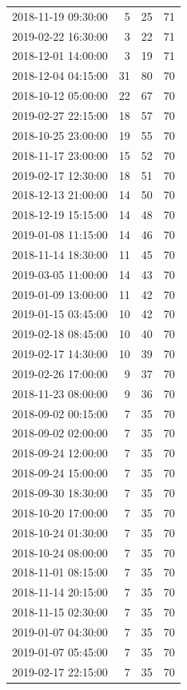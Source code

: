 \begin{tabular}{lrrr}
2018-11-19 09:30:00 & 5 & 25 & 71 \\
2019-02-22 16:30:00 & 3 & 22 & 71 \\
2018-12-01 14:00:00 & 3 & 19 & 71 \\
2018-12-04 04:15:00 & 31 & 80 & 70 \\
2018-10-12 05:00:00 & 22 & 67 & 70 \\
2019-02-27 22:15:00 & 18 & 57 & 70 \\
2018-10-25 23:00:00 & 19 & 55 & 70 \\
2018-11-17 23:00:00 & 15 & 52 & 70 \\
2019-02-17 12:30:00 & 18 & 51 & 70 \\
2018-12-13 21:00:00 & 14 & 50 & 70 \\
2018-12-19 15:15:00 & 14 & 48 & 70 \\
2019-01-08 11:15:00 & 14 & 46 & 70 \\
2018-11-14 18:30:00 & 11 & 45 & 70 \\
2019-03-05 11:00:00 & 14 & 43 & 70 \\
2019-01-09 13:00:00 & 11 & 42 & 70 \\
2019-01-15 03:45:00 & 10 & 42 & 70 \\
2019-02-18 08:45:00 & 10 & 40 & 70 \\
2019-02-17 14:30:00 & 10 & 39 & 70 \\
2019-02-26 17:00:00 & 9 & 37 & 70 \\
2018-11-23 08:00:00 & 9 & 36 & 70 \\
2018-09-02 00:15:00 & 7 & 35 & 70 \\
2018-09-02 02:00:00 & 7 & 35 & 70 \\
2018-09-24 12:00:00 & 7 & 35 & 70 \\
2018-09-24 15:00:00 & 7 & 35 & 70 \\
2018-09-30 18:30:00 & 7 & 35 & 70 \\
2018-10-20 17:00:00 & 7 & 35 & 70 \\
2018-10-24 01:30:00 & 7 & 35 & 70 \\
2018-10-24 08:00:00 & 7 & 35 & 70 \\
2018-11-01 08:15:00 & 7 & 35 & 70 \\
2018-11-14 20:15:00 & 7 & 35 & 70 \\
2018-11-15 02:30:00 & 7 & 35 & 70 \\
2019-01-07 04:30:00 & 7 & 35 & 70 \\
2019-01-07 05:45:00 & 7 & 35 & 70 \\
2019-02-17 22:15:00 & 7 & 35 & 70 \\

\end{tabular}
